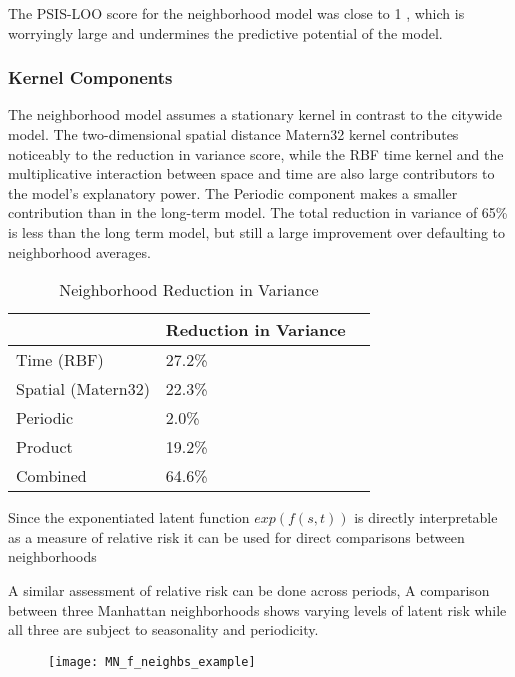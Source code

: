   The PSIS-LOO score for the neighborhood model was close to 1 , which is worryingly large and undermines the predictive potential of the model.

  \subsubsection{Kernel Components}

  The neighborhood model assumes a stationary kernel in contrast to the citywide model. The two-dimensional spatial distance Matern32 kernel contributes noticeably to the reduction in variance score, while the RBF time kernel and the multiplicative interaction between space and time are also large contributors to the model's explanatory power. The Periodic component makes a smaller contribution than in the long-term model. The total reduction in variance of 65\% is less than the long term model, but still a large improvement over defaulting to neighborhood averages. \par

  \begin{table}[]
  \centering
  \caption{Neighborhood Reduction in Variance}
  \label{variance_neighb}
  \begin{tabular}{@{}lll@{}}
  \toprule
                     & Reduction in Variance &  \\ \midrule
  Time (RBF)         & 27.2\%                &  \\
  Spatial (Matern32) & 22.3\%                &  \\
  Periodic           & 2.0\%                 &  \\
  Product            & 19.2\%                &  \\
  Combined           & 64.6\%                &  \\ \bottomrule
  \end{tabular}
  \end{table}



Since the exponentiated latent function $exp(f(s,t))$ is directly interpretable as a measure of relative risk it can be used for direct comparisons between neighborhoods \par


A similar assessment of relative risk can be done across periods, A comparison between three Manhattan neighborhoods shows varying levels of latent risk while all three are subject to seasonality and periodicity.

\begin{figure}[h!]
  \centering
  \texttt{[image: MN\_f\_neighbs\_example]}
\end{figure}




